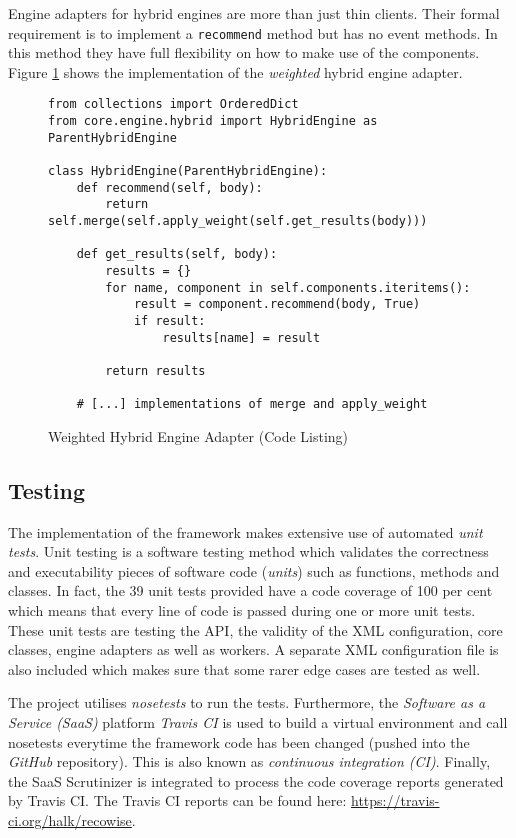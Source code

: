 Engine adapters for hybrid engines are more than just thin clients. Their formal requirement is to implement a \texttt{recommend} method but has no event methods. In this method they have full flexibility on how to make use of the components. Figure \ref{fig:implementation-framework-hybrid-engine-adapter} shows the implementation of the \emph{weighted} hybrid engine adapter.

\begin{figure}[!ht]
    \begin{verbatim}
from collections import OrderedDict
from core.engine.hybrid import HybridEngine as ParentHybridEngine

class HybridEngine(ParentHybridEngine):
    def recommend(self, body):
        return self.merge(self.apply_weight(self.get_results(body)))

    def get_results(self, body):
        results = {}
        for name, component in self.components.iteritems():
            result = component.recommend(body, True)
            if result:
                results[name] = result

        return results

    # [...] implementations of merge and apply_weight
    \end{verbatim}
    \caption{Weighted Hybrid Engine Adapter (Code Listing)}
    \label{fig:implementation-framework-hybrid-engine-adapter}
\end{figure}

\subsection{Testing}

The implementation of the framework makes extensive use of automated \emph{unit tests}. Unit testing is a software testing method which validates the correctness and executability pieces of software code (\emph{units}) such as functions, methods and classes. In fact, the 39 unit tests provided have a code coverage of 100 per cent which means that every line of code is passed during one or more unit tests. These unit tests are testing the API, the validity of the XML configuration, core classes, engine adapters as well as workers. A separate XML configuration file is also included which makes sure that some rarer edge cases are tested as well.

The project utilises \emph{nosetests} to run the tests. Furthermore, the \emph{Software as a Service (SaaS)} platform \emph{Travis CI} is used to build a virtual environment and call nosetests everytime the framework code has been changed (pushed into the \emph{GitHub} repository). This is also known as \emph{continuous integration (CI)}. Finally, the SaaS Scrutinizer is integrated to process the code coverage reports generated by Travis CI. The Travis CI reports can be found here: \url{https://travis-ci.org/halk/recowise}.

